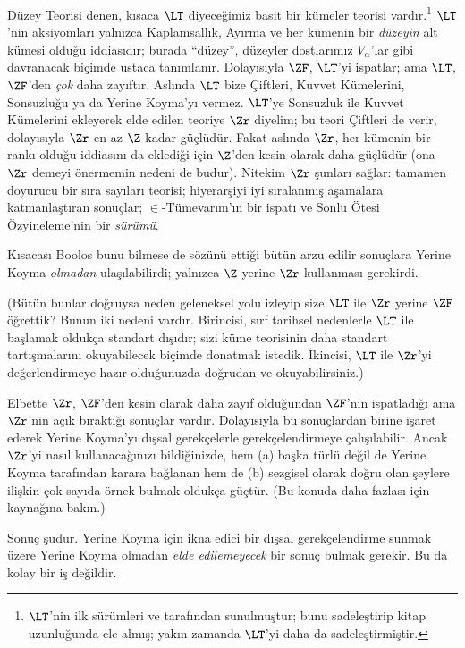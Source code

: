 Düzey Teorisi denen, kısaca $\LT$ diyeceğimiz basit bir kümeler teorisi
vardır.\footnote{$\LT$'nin ilk sürümleri \citet{Montague1965} ve
\citet{Scott1974} tarafından sunulmuştur; \citet{Potter2004} bunu
sadeleştirip kitap uzunluğunda ele almış; yakın zamanda \citet{ButtonLT1}
$\LT$'yi daha da sadeleştirmiştir.} $\LT$'nin aksiyomları yalnızca
Kaplamsallık, Ayırma ve her kümenin bir \emph{düzeyin} alt kümesi olduğu
iddiasıdır; burada ``düzey'', düzeyler dostlarımız $V_\alpha$'lar gibi
davranacak biçimde ustaca tanımlanır. Dolayısıyla $\ZF$, $\LT$'yi ispatlar;
ama $\LT$, $\ZF$'den \emph{çok} daha zayıftır. Aslında $\LT$ bize Çiftleri,
Kuvvet Kümelerini, Sonsuzluğu ya da Yerine Koyma'yı vermez. $\LT$'ye
Sonsuzluk ile Kuvvet Kümelerini ekleyerek elde edilen teoriye $\Zr$ diyelim;
bu teori Çiftleri de verir, dolayısıyla $\Zr$ en az $\Z$ kadar güçlüdür.
Fakat aslında $\Zr$, her kümenin bir rankı olduğu iddiasını da eklediği için
$\Z$'den kesin olarak daha güçlüdür (ona $\Zr$ demeyi önermemin nedeni de
budur). Nitekim $\Zr$ şunları sağlar: tamamen doyurucu bir sıra sayıları
teorisi; hiyerarşiyi iyi sıralanmış aşamalara katmanlaştıran sonuçlar;
$\in$-Tümevarım'ın bir ispatı ve Sonlu Ötesi Özyineleme'nin bir
\emph{sürümü}.

Kısacası Boolos bunu bilmese de sözünü ettiği bütün arzu edilir sonuçlara
Yerine Koyma \emph{olmadan} ulaşılabilirdi; yalnızca $\Z$ yerine $\Zr$
kullanması gerekirdi.

(Bütün bunlar doğruysa neden geleneksel yolu izleyip size $\LT$ ile $\Zr$
yerine $\ZF$ öğrettik? Bunun iki nedeni vardır. Birincisi, sırf tarihsel
nedenlerle $\LT$ ile başlamak oldukça standart dışıdır; sizi küme teorisinin
daha standart tartışmalarını okuyabilecek biçimde donatmak istedik. İkincisi,
$\LT$ ile $\Zr$'yi değerlendirmeye hazır olduğunuzda doğrudan
\citealt{Potter2004} ve \citealt{ButtonLT1} okuyabilirsiniz.)

Elbette $\Zr$, $\ZF$'den kesin olarak daha zayıf olduğundan $\ZF$'nin
ispatladığı ama $\Zr$'nin açık bıraktığı sonuçlar vardır. Dolayısıyla bu
sonuçlardan birine işaret ederek Yerine Koyma'yı dışsal gerekçelerle
gerekçelendirmeye çalışılabilir. Ancak $\Zr$'yi nasıl kullanacağınızı
bildiğinizde, hem (a) başka türlü değil de Yerine Koyma tarafından karara
bağlanan hem de (b) sezgisel olarak doğru olan şeylere ilişkin çok sayıda
örnek bulmak oldukça güçtür. (Bu konuda daha fazlası için
\citealt[\S13.2]{Potter2004} kaynağına bakın.)

Sonuç şudur. Yerine Koyma için ikna edici bir dışsal gerekçelendirme sunmak
üzere Yerine Koyma olmadan \emph{elde edilemeyecek} bir sonuç bulmak
gerekir. Bu da kolay bir iş değildir.

